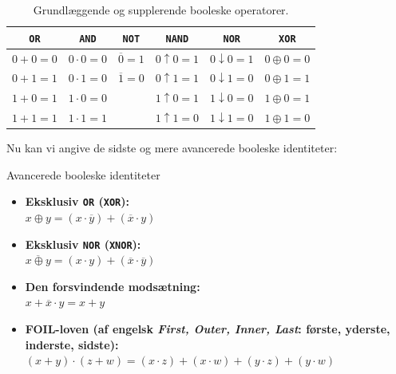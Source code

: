 \begin{table}[h!]
    \begin{center}
    \renewcommand{\arraystretch}{1.5} %
    \begin{tabular}{c|c|c|c|c|c}
    \texttt{OR} & \texttt{AND} & \texttt{NOT} & \texttt{NAND} & \texttt{NOR} & \texttt{XOR} \\
    \hline %
    $0 + 0 = 0$ & $0 \cdot 0 = 0$ & $\overline{0} = 1$ & $0 \uparrow 0 = 1$ & $0 \downarrow 0 = 1$ & $0 \oplus 0 = 0$ \\
    $0 + 1 = 1$ & $0 \cdot 1 = 0$ & $\overline{1} = 0$ & $0 \uparrow 1 = 1$ & $0 \downarrow 1 = 0$ & $0 \oplus 1 = 1$ \\
    $1 + 0 = 1$ & $1 \cdot 0 = 0$ & & $1 \uparrow 0 = 1$ & $1 \downarrow 0 = 0$ & $1 \oplus 0 = 1$ \\
    $1 + 1 = 1$ & $1 \cdot 1 = 1$ & & $1 \uparrow 1 = 0$ & $1 \downarrow 1 = 0$ & $1 \oplus 1 = 0$ \\
    \end{tabular}
    \end{center}
    \caption{Grundlæggende og supplerende booleske operatorer.}
    \label{tab:mergedops}
\end{table}


Nu kan vi angive de sidste og mere avancerede booleske identiteter:

\begin{custombox}{Avancerede booleske identiteter}
\begin{itemize}
    \item \textbf{Eksklusiv \texttt{OR} (\texttt{XOR}):} \\
    \hspace*{15pt} $x \oplus y = (x \cdot \overline{y}) + (\overline{x} \cdot y)$
    
    \item \textbf{Eksklusiv \texttt{NOR} (\texttt{XNOR}):} \\
    \hspace*{15pt} $\overline{x \oplus y} = (x \cdot y) + (\overline{x} \cdot \overline{y})$
    
    \item \textbf{Den forsvindende modsætning:} \\
    \hspace*{15pt} $x + \overline{x} \cdot y = x + y$
    
    \item \textbf{FOIL-loven (af engelsk \emph{First, Outer, Inner, Last}: første, yderste, inderste, sidste):} \\
    \hspace*{15pt} $(x + y) \cdot (z + w) = (x \cdot z) + (x \cdot w) + (y \cdot z) + (y \cdot w)$
\end{itemize}
\end{custombox}

